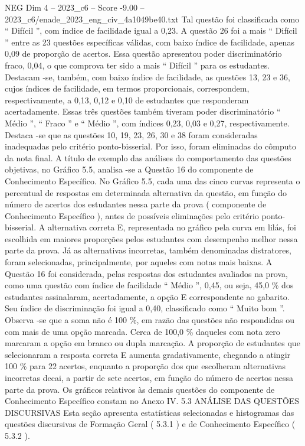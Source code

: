 \begin{textsample}{NEG Dim 4 – 2023\_c6 – Score -9.00 – 2023\_c6/enade\_2023\_eng\_civ\_4a1049be40.txt}
Tal questão foi classificada como “ Difícil ”, com índice de facilidade igual a 0,23.
A questão 26 foi a mais “ Difícil ” entre as 23 questões específicas válidas, com baixo índice de facilidade, apenas 0,09 de proporção de acertos.
Essa questão apresentou poder discriminatório fraco, 0,04, o que comprova ter sido a mais “ Difícil ” para os estudantes.
Destacam -se, também, com baixo índice de facilidade, as questões 13, 23 e 36, cujos índices de facilidade, em termos proporcionais, correspondem, respectivamente, a 0,13, 0,12 e 0,10 de estudantes que responderam acertadamente.
Essas três questões também tiveram poder discriminatório “ Médio ”, “ Fraco ” e “ Médio ”, com índices 0,23, 0,03 e 0,27, respectivamente.
Destaca -se que as questões 10, 19, 23, 26, 30 e 38 foram consideradas inadequadas pelo critério ponto-bisserial.
Por isso, foram eliminadas do cômputo da nota final.
A título de exemplo das análises do comportamento das questões objetivas, no Gráfico 5.5, analisa -se a Questão 16 do componente de Conhecimento Específico.
No Gráfico 5.5, cada uma das cinco curvas representa o percentual de respostas em determinada alternativa da questão, em função do número de acertos dos estudantes nessa parte da prova ( componente de Conhecimento Específico ), antes de possíveis eliminações pelo critério ponto-bisserial.
A alternativa correta E, representada no gráfico pela curva em lilás, foi escolhida em maiores proporções pelos estudantes com desempenho melhor nessa parte da prova.
Já as alternativas incorretas, também denominadas distratores, foram selecionadas, principalmente, por aqueles com notas mais baixas.
A Questão 16 foi considerada, pelas respostas dos estudantes avaliados na prova, como uma questão com índice de facilidade “ Médio ”, 0,45, ou seja, 45,0 \% dos estudantes assinalaram, acertadamente, a opção E correspondente ao gabarito.
Seu índice de discriminação foi igual a 0,40, classificado como “ Muito bom ”.
Observa -se que a soma não é 100 \%, em razão das questões não respondidas ou com mais de uma opção marcada.
Cerca de 100,0 \% daqueles com nota zero marcaram a opção em branco ou dupla marcação.
A proporção de estudantes que selecionaram a resposta correta E aumenta gradativamente, chegando a atingir 100 \% para 22 acertos, enquanto a proporção dos que escolheram alternativas incorretas decai, a partir de sete acertos, em função do número de acertos nessa parte da prova.
Os gráficos relativos às demais questões do componente de Conhecimento Específico constam no Anexo IV. 5.3 ANÁLISE DAS QUESTÕES DISCURSIVAS Esta seção apresenta estatísticas selecionadas e histogramas das questões discursivas de Formação Geral ( 5.3.1 ) e de Conhecimento Específico ( 5.3.2 ).

\end{textsample}
